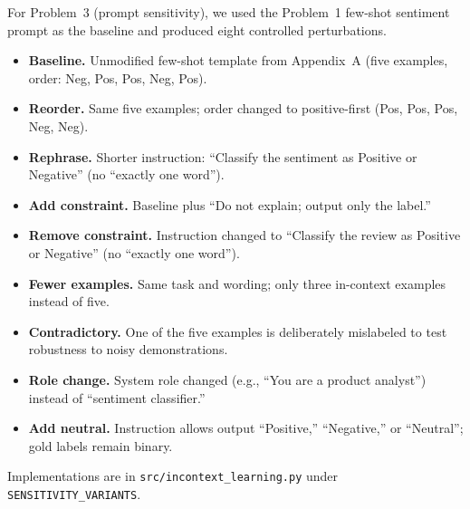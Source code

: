 For Problem~3 (prompt sensitivity), we used the Problem~1 few-shot sentiment prompt as the baseline and produced eight controlled perturbations.

\begin{itemize}
  \item \textbf{Baseline.} Unmodified few-shot template from Appendix~A (five examples, order: Neg, Pos, Pos, Neg, Pos).
  \item \textbf{Reorder.} Same five examples; order changed to positive-first (Pos, Pos, Pos, Neg, Neg).
  \item \textbf{Rephrase.} Shorter instruction: ``Classify the sentiment as Positive or Negative'' (no ``exactly one word'').
  \item \textbf{Add constraint.} Baseline plus ``Do not explain; output only the label.''
  \item \textbf{Remove constraint.} Instruction changed to ``Classify the review as Positive or Negative'' (no ``exactly one word'').
  \item \textbf{Fewer examples.} Same task and wording; only three in-context examples instead of five.
  \item \textbf{Contradictory.} One of the five examples is deliberately mislabeled to test robustness to noisy demonstrations.
  \item \textbf{Role change.} System role changed (e.g., ``You are a product analyst'') instead of ``sentiment classifier.''
  \item \textbf{Add neutral.} Instruction allows output ``Positive,'' ``Negative,'' or ``Neutral''; gold labels remain binary.
\end{itemize}

Implementations are in \texttt{src/incontext\_learning.py} under \texttt{SENSITIVITY\_VARIANTS}.
